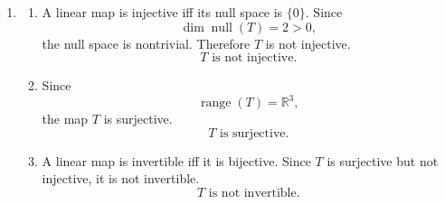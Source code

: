 \documentclass[12pt]{article}
\begin{document}
\begin{enumerate}[label=(\alph*)]
Now determine the null space. By definition,
\[
\operatorname{null}(T)=\{f\in P_4(\mathbb{R}) : f(0)=f(1)=f(2)=0\}.
\]
So every $f\in\operatorname{null}(T)$ has roots $0,1,2$. By the factor theorem,
\[
f(x)=x(x-1)(x-2)q(x)
\]
for some polynomial $q(x)$. Since $\deg f\le 4$, we must have $\deg q\le 1$, so
\[
q(x)=ax+b
\qquad (a,b\in\mathbb{R}).
\]
Hence
\[
f(x)=a\,x^2(x-1)(x-2)+b\,x(x-1)(x-2),
\]
which shows that
\[
\operatorname{null}(T)
=
\operatorname{span}\{x(x-1)(x-2),\,x^2(x-1)(x-2)\}.
\]
Therefore
\[
\dim\operatorname{null}(T)=2.
\]

Thus
\[
\boxed{\dim\operatorname{null}(T)=2,\qquad \dim\operatorname{range}(T)=3.}
\]

\item
\begin{enumerate}[label=(\roman*)]
\item A linear map is injective iff its null space is $\{0\}$. Since
\[
\dim\operatorname{null}(T)=2>0,
\]
the null space is nontrivial. Therefore $T$ is not injective.
\[
\boxed{\,T\text{ is not injective.}\,}
\]

\item Since
\[
\operatorname{range}(T)=\mathbb{R}^3,
\]
the map $T$ is surjective.
\[
\boxed{\,T\text{ is surjective.}\,}
\]

\item A linear map is invertible iff it is bijective. Since $T$ is surjective but not injective, it is not invertible.
\[
\boxed{\,T\text{ is not invertible.}\,}
\]
\end{enumerate}
\end{enumerate}
\end{document}
